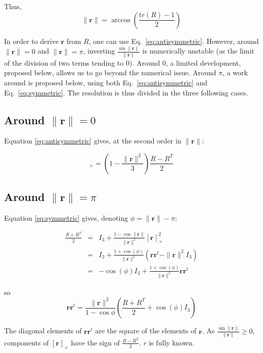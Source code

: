 \documentclass {article}
\newcommand\rot{\mathbf{r}}
\newcommand\rcross[1]{[\rot_{#1}]_{\times}}
\newcommand\normr{\|\rot\|}
\begin{document}
Thus,
\begin{equation}
\normr = \arccos \left( \frac{tr(R) - 1}{2} \right)
\end{equation}

In order to derive $\rot$ from $R$, one can use Eq.\ \ref{eq:antisymmetric}.
However, around $\normr = 0$ and $\normr = \pi$, inverting $\frac{\sin\normr}{\normr}$ is numerically unstable (as the limit of the division of two terms tending to 0).
Around $0$, a limited development, proposed below, allows us to go beyond the numerical issue.
Around $\pi$, a work around is proposed below, using both Eq.\ \ref{eq:antisymmetric} and Eq.\ \ref{eq:symmetric}.
The resolution is thus divided in the three following cases.

\subsection{Around $\normr = 0$}

Equation \ref{eq:antisymmetric} gives, at the second order in $\normr$:

\begin{equation}
  \rcross{} = ( 1 - \frac{\normr^2}{3}) \frac{R - R^T}{2}
\end{equation}

\subsection{Around $\normr = \pi$}

Equation \ref{eq:symmetric} gives, denoting $\phi = \normr - \pi$:

\begin{eqnarray*}
\frac{R + R^T}{2} &=& I_3 + \frac{1 - \cos \normr}{\normr^2}\rcross{}^2 \\
                  &=& I_3 + \frac{1 + \cos \left( \phi \right) }{\normr^2} \left( \rot \rot^t - \normr^2 I_3 \right) \\
                  &=& - \cos (\phi) I_3 + \frac{1 + \cos \left( \phi \right) }{\normr^2} \rot \rot^t
\end{eqnarray*}

so
\begin{equation}
\rot \rot^t = \frac{\normr^2}{1 - \cos\phi} \left( \frac{R + R^T}{2} + \cos(\phi) I_3 \right)
\end{equation}

The diagonal elements of $\rot \rot^t$ are the square of the elements of $\rot$.
As $\frac{\sin \normr}{\normr} \geq 0 $, components of $\rcross{}$ have the sign of $\frac{R - R^T}{2}$.
$r$ is fully known.
\end{document}
